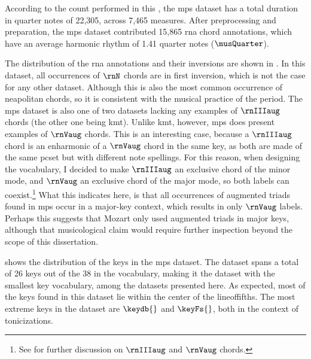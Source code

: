 
According to the count performed in this \thesisdiss{}, the
\gls{mps} dataset has a total duration in quarter notes of
22,305, across 7,465 measures. After preprocessing and
preparation, the \gls{mps} dataset contributed 15,865
\gls{rna} chord annotations, which have an average harmonic
rhythm of 1.41 quarter notes ($\musQuarter$).

The distribution of the \gls{rna} annotations and their
inversions are shown in . In this
dataset, all occurrences of $\rnN$ chords are in first
inversion, which is not the case for any other dataset.
Although this is also the most common occurrence of
\gls{neapolitan} chords, so it is consistent with the
musical practice of the period. The \gls{mps} dataset is
also one of two datasets lacking any examples of $\rnIIIaug$
chords (the other one being \gls{kmt}). Unlike \gls{kmt},
however, \gls{mps} does present examples of $\rnVaug$
chords. This is an interesting case, because a $\rnIIIaug$
chord is an enharmonic of a $\rnVaug$ chord in the same key,
as both are made of the same \gls{pcset} but with different
note spellings. For this reason, when designing the
vocabulary, I decided to make $\rnIIIaug$ an exclusive chord
of the minor mode, and $\rnVaug$ an exclusive chord of the
major mode, so both labels can coexist.\footnote{See
 for further
discussion on $\rnIIIaug$ and $\rnVaug$ chords.} What this
indicates here, is that all occurrences of augmented triads
found in \gls{mps} occur in a major-key context, which
results in only $\rnVaug$ labels. Perhaps this suggests that
Mozart only used augmented triads in major keys, although
that musicological claim would require further inspection
beyond the scope of this dissertation.



 shows the distribution of the keys
in the \gls{mps} dataset. The dataset spans a total of 26
keys out of the 38 in the vocabulary, making it the dataset
with the smallest key vocabulary, among the datasets
presented here. As expected, most of the keys found in this
dataset lie within the center of the \gls{lineoffifths}. The
most extreme keys in the dataset are $\keydb{}$ and
$\keyFs{}$, both in the context of tonicizations.
